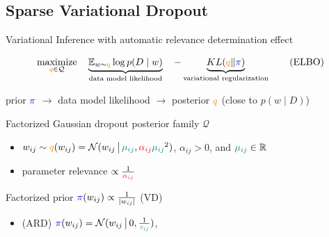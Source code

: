 \documentclass{beamer}
\newcommand{\real}{\mathbb{R}}
\begin{document}
\subsection{Sparse Variational Dropout \citep{molchanov_variational_2017}} %
\label{sub:sparse_variational_dropout}

\begin{frame}[c]{\insertsubsection}{\insertsection}
  Variational Inference with automatic relevance determination effect


  \begin{equation}
    \label{eq:elbo}
    \underset{
      {\color{orange} q} \in \mathcal{Q}
    }{\text{maximize}}
    \quad
    \underbrace{
      \mathbb{E}_{w \sim {\color{orange} q}}
          \log p(D\mid w)  %
    }_{
      \text{data model likelihood}
    }
    \quad
    - \underbrace{
      \mathop{KL}({\color{orange} q}\|{\color{blue} \pi})
    }_{
      \text{variational regularization}
    }
    \tag{ELBO}
  \end{equation}

  \medskip
  prior ${\color{blue} \pi}$
    $\to$ data model likelihood
    $\to$ posterior ${\color{orange} q}$
    (close to $p(w \mid D)$)
  
  \bigskip
  Factorized Gaussian dropout posterior family $\mathcal{Q}$
  \begin{itemize}
    \item $
      w_{ij} \sim {\color{orange} q}(w_{ij})
        = \mathcal{N}(
          w_{ij}\,\big\vert\,
          {\color{teal} \mu_{ij}},
          {\color{red} \alpha_{ij}}
            {\color{teal} \mu_{ij}}^2
        )
    $, $\alpha_{ij} > 0$, and ${\color{teal} \mu_{ij}} \in \real$
    \item parameter relevance $\propto \frac1{{\color{red} \alpha_{ij}}}$
  \end{itemize}

  \smallskip
  Factorized prior $
    {\color{blue} \pi}(w_{ij})
      \propto \frac1{\lvert w_{ij}\rvert}
  $ (VD)
  \begin{itemize}
    \item (ARD) $
      {\color{blue} \pi}(w_{ij}) = \mathcal{N}(
        w_{ij}\,\big\vert\,
        0, \tfrac1{{\color{teal} \tau_{ij}}}
      )
    $, \citep{kharitonov_variational_2018}
  \end{itemize}
\end{frame}
\end{document}
